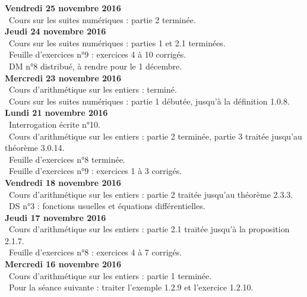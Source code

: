 \documentclass[12pt,a4paper]{article}
\begin{document}
\noindent\textbf{Vendredi 25 novembre 2016}\\
\bu\ Cours sur les suites numériques : partie 2 terminée.\vspace{.4cm}\\

\noindent\textbf{Jeudi 24 novembre 2016}\\
\bu\ Cours sur les suites numériques : parties 1 et 2.1 terminées.\\
\bu\ Feuille d'exercices n°9 : exercices 4 à 10 corrigés. \\
\bu\ DM n°8 distribué, à rendre pour le 1 décembre.\vspace{.4cm}\\

\noindent\textbf{Mercredi 23 novembre 2016}\\
\bu\ Cours d'arithmétique sur les entiers : terminé. \\
\bu\ Cours sur les suites numériques : partie 1 débutée, jusqu'à la définition 1.0.8.\vspace{.4cm}\\

\noindent\textbf{Lundi 21 novembre 2016}\\
\bu\ Interrogation écrite n°10.\\
\bu\ Cours d'arithmétique sur les entiers : partie 2 terminée, partie 3 traitée jusqu'au théorème 3.0.14. \\
\bu\ Feuille d'exercices n°8 terminée. \\
\bu\ Feuille d'exercices n°9 : exercices 1 à 3 corrigés.\vspace{.4cm}\\

\noindent\textbf{Vendredi 18 novembre 2016}\\
\bu\ Cours d'arithmétique sur les entiers : partie 2 traitée jusqu'au théorème 2.3.3. \\
\bu\ DS n°3 : fonctions  usuelles et équations différentielles.\vspace{.4cm}\\

\noindent\textbf{Jeudi 17 novembre 2016}\\
\bu\ Cours d'arithmétique sur les entiers : partie 2.1 traitée jusqu'à la proposition 2.1.7. \\
\bu\ Feuille d'exercices n°8 : exercices 4 à 7 corrigés.\vspace{.4cm}\\

\noindent\textbf{Mercredi 16 novembre 2016}\\
\bu\ Cours d'arithmétique sur les entiers : partie 1 terminée. \\
\bu\ Pour la séance suivante : traiter l'exemple 1.2.9 et l'exercice 1.2.10.\vspace{.4cm}\\
\end{document}

